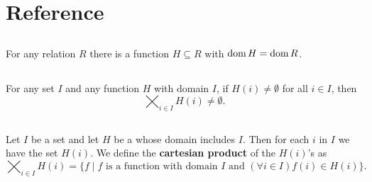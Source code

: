\documentclass{report}
\begin{document}

\tableofcontents

\begingroup
\renewcommand\thechapter{R}
\setcounter{chapter}{0}
\addtocounter{chapter}{-1}

\chapter{Reference}%
\label{chap:reference}

\section{}%
\label{ref:axiom-of-choice-1}

For any relation $R$ there is a function $H \subseteq R$ with
  $\mathop{\text{dom}}{H} = \mathop{\text{dom}}{R}$.

\begin{axiom}


\end{axiom}

\section{}%
\label{ref:axiom-of-choice-2}

For any set $I$ and any function $H$ with domain $I$, if $H(i) \neq \emptyset$
  for all $i \in I$, then $$\bigtimes_{i \in I} H(i) \neq \emptyset.$$

\begin{axiom}


\end{axiom}

\section{}%
\label{ref:cartesian-product}

Let $I$ be a set and let $H$ be a  whose domain includes $I$.
Then for each $i$ in $I$ we have the set $H(i)$.
We define the \textbf{cartesian product} of the $H(i)$'s as
  $$\bigtimes_{i \in I} H(i) = \{f \mid
    f \text{ is a function with domain } I \text{ and }
      (\forall i \in I) f(i) \in H(i)\}.$$

\section{}%
\label{ref:compatible}
\end{document}

